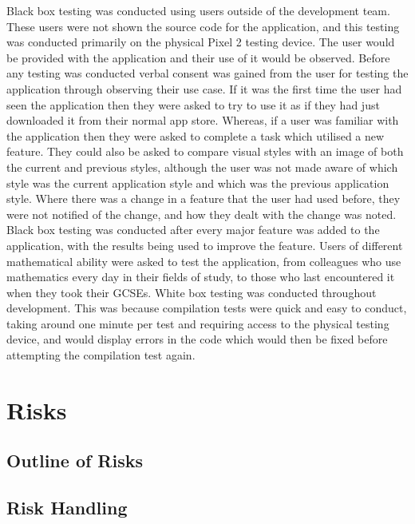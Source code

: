 \documentclass{article}
\begin{document}
Black box testing was conducted using users outside of the development team. These users were not shown the source code for the application, and this testing was conducted primarily on the physical Pixel 2 testing device. The user would be provided with the application and their use of it would be observed. Before any testing was conducted verbal consent was gained from the user for testing the application through observing their use case. If it was the first time the user had seen the application then they were asked to try to use it as if they had just downloaded it from their normal app store. Whereas, if a user was familiar with the application then they were asked to complete a task which utilised a new feature. They could also be asked to compare visual styles with an image of both the current and previous styles, although the user was not made aware of which style was the current application style and which was the previous application style. Where there was a change in a feature that the user had used before, they were not notified of the change, and how they dealt with the change was noted. \\

Black box testing was conducted after every major feature was added to the application, with the results being used to improve the feature. Users of different mathematical ability were asked to test the application, from colleagues who use mathematics every day in their fields of study, to those who last encountered it when they took their GCSEs. White box testing was conducted throughout development. This was because compilation tests were quick and easy to conduct, taking around one minute per test and requiring access to the physical testing device, and would display errors in the code which would then be fixed before attempting the compilation test again. \\

\section{Risks}
\label{section:risks}

\subsection{Outline of Risks}

\subsection{Risk Handling}
\end{document}
